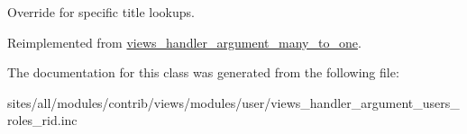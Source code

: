 Override for specific title lookups. 

Reimplemented from \hyperlink{classviews__handler__argument__many__to__one_0b758f84ee6b9a473313ec92714b06c7}{views\_\-handler\_\-argument\_\-many\_\-to\_\-one}.

The documentation for this class was generated from the following file:\begin{CompactItemize}
\item 
sites/all/modules/contrib/views/modules/user/views\_\-handler\_\-argument\_\-users\_\-roles\_\-rid.inc\end{CompactItemize}
